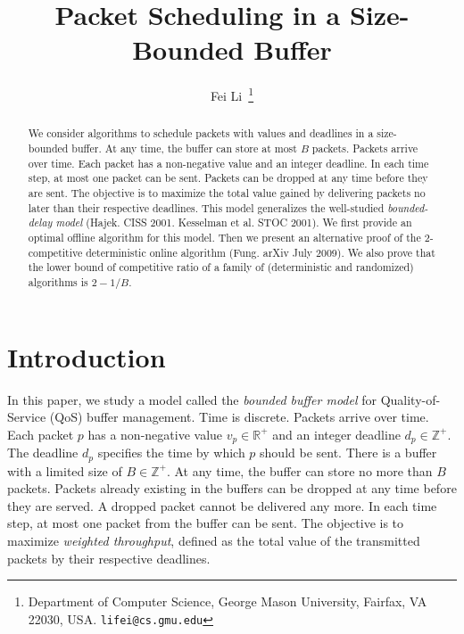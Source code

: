 \documentclass[final, 11pt]{article}
\begin{document}
\title{Packet Scheduling in a Size-Bounded Buffer}


\author{Fei Li~\thanks{Department of Computer Science, George Mason University, Fairfax, VA 22030, USA. {\tt lifei@cs.gmu.edu}}}

\maketitle



\begin{abstract}
We consider algorithms to schedule packets with values and deadlines in a size-bounded buffer. At any time, the buffer can store at most $B$ packets. Packets arrive over time. Each packet has a non-negative value and an integer deadline. In each time step, at most one packet can be sent. Packets can be dropped at any time before they are sent. The objective is to maximize the total value gained by delivering packets no later than their respective deadlines. This model generalizes the well-studied {\em bounded-delay model} (Hajek. CISS 2001. Kesselman et al. STOC 2001). We first provide an optimal offline algorithm for this model. Then we present an alternative proof of the $2$-competitive deterministic online algorithm (Fung. arXiv July 2009). We also prove that the lower bound of competitive ratio of a family of (deterministic and randomized) algorithms is $2 - 1 / B$.
\end{abstract}



\section{Introduction}

In this paper, we study a model called the {\em bounded buffer model} for Quality-of-Service (QoS) buffer management. Time is discrete. Packets arrive over time. Each packet $p$ has a non-negative value $v_p \in \mathbb R^+$ and an integer deadline $d_p \in \mathbb Z^+$. The deadline $d_p$ specifies the time by which $p$ should be sent. There is a buffer with a limited size of $B \in \mathbb Z^+$. At any time, the buffer can store no more than $B$ packets. Packets already existing in the buffers can be dropped at any time before they are served. A dropped packet cannot be delivered any more. In each time step, at most one packet from the buffer can be sent. The objective is to maximize {\em weighted throughput}, defined as the total value of the transmitted packets by their respective deadlines.
\end{document}
